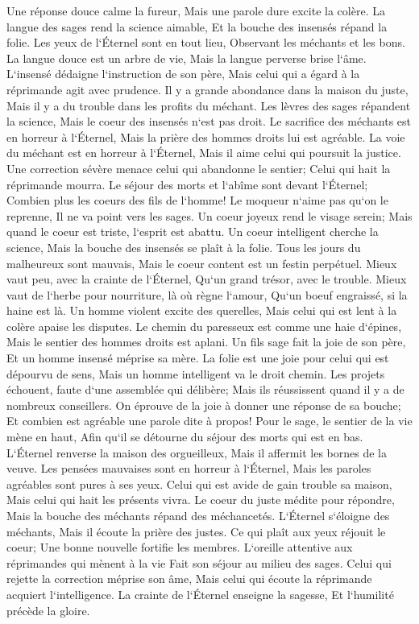 \verse Une réponse douce calme la fureur, Mais une parole dure excite la colère. 
\verse La langue des sages rend la science aimable, Et la bouche des insensés répand la folie. 
\verse Les yeux de l`Éternel sont en tout lieu, Observant les méchants et les bons. 
\verse La langue douce est un arbre de vie, Mais la langue perverse brise l`âme. 
\verse L`insensé dédaigne l`instruction de son père, Mais celui qui a égard à la réprimande agit avec prudence. 
\verse Il y a grande abondance dans la maison du juste, Mais il y a du trouble dans les profits du méchant. 
\verse Les lèvres des sages répandent la science, Mais le coeur des insensés n`est pas droit. 
\verse Le sacrifice des méchants est en horreur à l`Éternel, Mais la prière des hommes droits lui est agréable. 
\verse La voie du méchant est en horreur à l`Éternel, Mais il aime celui qui poursuit la justice. 
\verse Une correction sévère menace celui qui abandonne le sentier; Celui qui hait la réprimande mourra. 
\verse Le séjour des morts et l`abîme sont devant l`Éternel; Combien plus les coeurs des fils de l`homme! 
\verse Le moqueur n`aime pas qu`on le reprenne, Il ne va point vers les sages. 
\verse Un coeur joyeux rend le visage serein; Mais quand le coeur est triste, l`esprit est abattu. 
\verse Un coeur intelligent cherche la science, Mais la bouche des insensés se plaît à la folie. 
\verse Tous les jours du malheureux sont mauvais, Mais le coeur content est un festin perpétuel. 
\verse Mieux vaut peu, avec la crainte de l`Éternel, Qu`un grand trésor, avec le trouble. 
\verse Mieux vaut de l`herbe pour nourriture, là où règne l`amour, Qu`un boeuf engraissé, si la haine est là. 
\verse Un homme violent excite des querelles, Mais celui qui est lent à la colère apaise les disputes. 
\verse Le chemin du paresseux est comme une haie d`épines, Mais le sentier des hommes droits est aplani. 
\verse Un fils sage fait la joie de son père, Et un homme insensé méprise sa mère. 
\verse La folie est une joie pour celui qui est dépourvu de sens, Mais un homme intelligent va le droit chemin. 
\verse Les projets échouent, faute d`une assemblée qui délibère; Mais ils réussissent quand il y a de nombreux conseillers. 
\verse On éprouve de la joie à donner une réponse de sa bouche; Et combien est agréable une parole dite à propos! 
\verse Pour le sage, le sentier de la vie mène en haut, Afin qu`il se détourne du séjour des morts qui est en bas. 
\verse L`Éternel renverse la maison des orgueilleux, Mais il affermit les bornes de la veuve. 
\verse Les pensées mauvaises sont en horreur à l`Éternel, Mais les paroles agréables sont pures à ses yeux. 
\verse Celui qui est avide de gain trouble sa maison, Mais celui qui hait les présents vivra. 
\verse Le coeur du juste médite pour répondre, Mais la bouche des méchants répand des méchancetés. 
\verse L`Éternel s`éloigne des méchants, Mais il écoute la prière des justes. 
\verse Ce qui plaît aux yeux réjouit le coeur; Une bonne nouvelle fortifie les membres. 
\verse L`oreille attentive aux réprimandes qui mènent à la vie Fait son séjour au milieu des sages. 
\verse Celui qui rejette la correction méprise son âme, Mais celui qui écoute la réprimande acquiert l`intelligence. 
\verse La crainte de l`Éternel enseigne la sagesse, Et l`humilité précède la gloire. 

